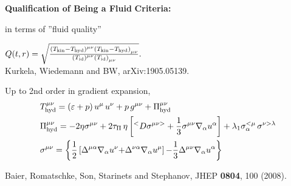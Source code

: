 \documentclass[9pt,a4paper,unknownkeysallowed,xcolor=dvipsnames,aspectratio=43]{beamer}
\begin{document}
\begin{frame}{\bf\huge Qualification of Being a Fluid}
\vspace{4mm}
{\color{darkred}\bf\LARGE Criteria:}
\vspace{4mm}
\begin{center}
{\huge\color{darkred}
}
\end{center}
\vspace{4mm}
{\Large \color{black} in terms of  ''fluid quality''}
\begin{center}
{\Large\color{black}
{
$Q(t,r) =  \sqrt{  \frac{ \left( T_{\rm kin}- T_{\rm hyd} \right)^{\mu\nu}   \left( T_{\rm kin} - T_{\rm hyd} \right)_{\mu\nu} }{ \left(T_{\rm id} \right)^{\mu\nu}    \left(T_{\rm id} \right)_{\mu\nu}    }  }.$
}
}
\vspace{2mm}\\
{\tiny  {\color{teablue} Kurkela, Wiedemann and BW, arXiv:1905.05139.
  }
  }
\end{center}
\vspace{2mm}
{\color{black}\Large Up to 2nd order in gradient expansion, }
\begin{align}
&T_{\rm hyd}^{\mu\nu} = \left( \varepsilon + p\right) u^\mu\, u^\nu + p\, g^{\mu\nu} + \Pi^{\mu\nu}_{\rm hyd}\nonumber\\
&\Pi^{\mu\nu}_{\rm hyd} = - 2 \eta \sigma^{\mu\nu}+ 2 \tau_{\Pi}\, \eta \left[ ^<D\sigma^{\mu\nu>} 
	+ \frac{1}{3} \sigma^{\mu\nu} \nabla_\alpha u^\alpha \right] +	\lambda_1 \sigma^{<\mu}_\alpha\, \sigma^{\nu> \lambda} \nonumber\\
&\sigma^{\mu\nu} =  \left\{\frac{1}{2}\left[ \Delta^{\mu\alpha} \nabla_\alpha u^\nu {+} \Delta^{\nu\alpha} \nabla_\alpha u^\mu \right] 
				{-} \frac{1}{3}\Delta^{\mu\nu} \nabla_\alpha u^\alpha \right\}\nonumber
\end{align}
\begin{center}
\vspace{2mm}
{\tiny  {\color{teablue}   Baier, Romatschke, Son, Starinets and Stephanov,
  JHEP {\bf 0804}, 100 (2008).
  }
  }
  \end{center}
\end{frame}
%
%
\end{document}
